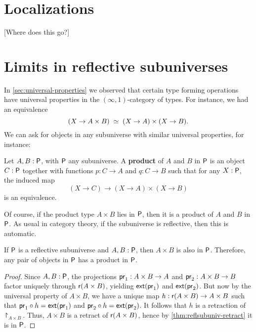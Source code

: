 

\section{Localizations}
\label{sec:localizations}

[Where does this go?]


\section{Limits in reflective subuniverses}
\label{sec:pullbacks}

In \autoref{sec:universal-properties} we observed that certain type forming operations have universal properties in the
$(\infty,1)$-category of types.
For instance, we had an equivalence
\[ \eqvspaced{(X\to A\times B) }{(X\to A)\times (X\to B)}. \]
We can ask for objects in any subuniverse with similar universal properties, for instance:

\begin{defn}
  Let $A,B:\P$, with $\P$ any subuniverse.
  A \textbf{product} of $A$ and $B$ in $\P$ is an object $C:\P$ together with functions $p:C\to A$ and $q:C\to B$ such that for any $X:\P$,
the induced map
  \[ (X\to C) \to (X\to A)\times (X\to B) \]
  is an equivalence.
\end{defn}

Of course, if the product type $A\times B$ lies in $\P$, then it is a product of $A$ and $B$ in $\P$.
As usual in category theory, if the subuniverse is reflective, then this is automatic.

\begin{thm}\label{thm:reflsubuniv-prod}
  If $\P$ is a reflective subuniverse and $A,B:\P$, then $A\times B$ is also in $\P$.
  Therefore, any pair of objects in $\P$ has a product in $\P$.
\end{thm}
\begin{proof}
  Since $A,B:\P$, the projections $\proj1:A\times B\to A$ and $\proj2:A\times B\to B$ factor uniquely through $\reflect(A\times B)$,
yielding $\ext(\proj1)$ and $\ext(\proj2)$.
  But now by the universal property of $A\times B$, we have a unique map $h:\reflect(A\times B) \to A\times B$ such that $\proj1 \circ h =
\ext(\proj1)$ and $\proj2\circ h = \ext(\proj2)$.
  It follows that $h$ is a retraction of $\project_{A\times B}$.
  Thus, $A\times B$ is a retract of $\reflect(A\times B)$, hence by \autoref{thm:reflsubuniv-retract} it is in $\P$.
\end{proof}

